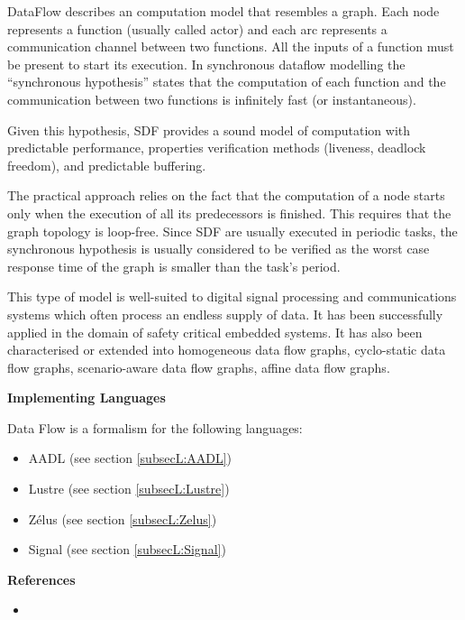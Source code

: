 DataFlow describes an computation model that resembles a graph. Each node represents a function (usually called actor) and each arc represents a communication channel between two functions. All the inputs of a function must be present to start its execution. In synchronous dataflow modelling the ``synchronous hypothesis'' states that the computation of each function and the communication between two functions is infinitely fast (or instantaneous). 

Given this hypothesis, SDF provides a sound model of computation with predictable performance, properties verification methods (liveness, deadlock freedom), and predictable buffering.

The practical approach relies on the fact that the computation of a node starts only when the execution of all its predecessors is finished. This requires that the graph topology is loop-free. Since SDF are usually executed in periodic tasks, the synchronous hypothesis is usually considered to be verified as the worst case response time of the graph is smaller than the task's period.

This type of model is well-suited to digital signal processing and communications systems which often process an endless supply of data. It has been successfully applied in the domain of safety critical embedded systems. It has also been characterised or extended into homogeneous data flow graphs, cyclo-static data flow graphs, scenario-aware data flow graphs, affine data flow graphs.

\textbf{Implementing Languages}

Data Flow is a formalism for the following languages:
\begin{itemize}
	\item AADL (see section \ref{subsecL:AADL})
	\item Lustre (see section \ref{subsecL:Lustre})
	\item Z\'elus (see section \ref{subsecL:Zelus})
	\item Signal (see section \ref{subsecL:Signal})
\end{itemize}





\textbf{References}
\begin{itemize}
	
\item {}
\end{itemize}



